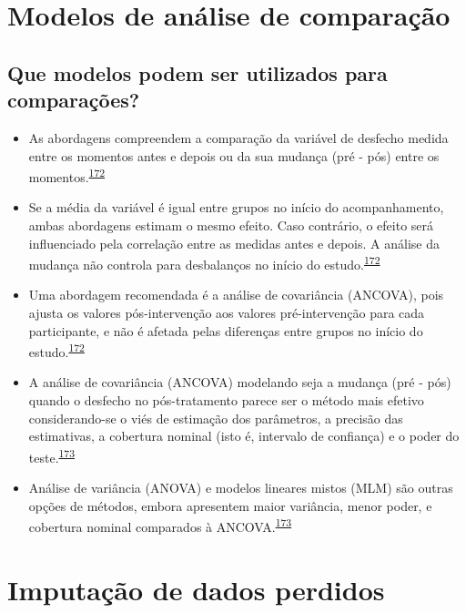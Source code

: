 \documentclass[
  a4paper,
]{book}
\begin{document}
\hypertarget{metodos-comparacao}{%
\section{Modelos de análise de comparação}\label{metodos-comparacao}}

\hypertarget{que-modelos-podem-ser-utilizados-para-comparauxe7uxf5es}{%
\subsection{Que modelos podem ser utilizados para comparações?}\label{que-modelos-podem-ser-utilizados-para-comparauxe7uxf5es}}

\begin{itemize}
\item
  As abordagens compreendem a comparação da variável de desfecho medida entre os momentos antes e depois ou da sua mudança (pré - pós) entre os momentos.\textsuperscript{\protect\hyperlink{ref-Vickers2001}{172}}
\item
  Se a média da variável é igual entre grupos no início do acompanhamento, ambas abordagens estimam o mesmo efeito. Caso contrário, o efeito será influenciado pela correlação entre as medidas antes e depois. A análise da mudança não controla para desbalanços no início do estudo.\textsuperscript{\protect\hyperlink{ref-Vickers2001}{172}}
\item
  Uma abordagem recomendada é a análise de covariância (ANCOVA), pois ajusta os valores pós-intervenção aos valores pré-intervenção para cada participante, e não é afetada pelas diferenças entre grupos no início do estudo.\textsuperscript{\protect\hyperlink{ref-Vickers2001}{172}}
\item
  A análise de covariância (ANCOVA) modelando seja a mudança (pré - pós) quando o desfecho no pós-tratamento parece ser o método mais efetivo considerando-se o viés de estimação dos parâmetros, a precisão das estimativas, a cobertura nominal (isto é, intervalo de confiança) e o poder do teste.\textsuperscript{\protect\hyperlink{ref-OConnell2017}{173}}
\item
  Análise de variância (ANOVA) e modelos lineares mistos (MLM) são outras opções de métodos, embora apresentem maior variância, menor poder, e cobertura nominal comparados à ANCOVA.\textsuperscript{\protect\hyperlink{ref-OConnell2017}{173}}
\end{itemize}

\hypertarget{imputacao-dados}{%
\section{Imputação de dados perdidos}\label{imputacao-dados}}
\end{document}

